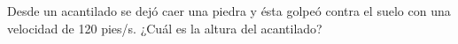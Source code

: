 \item Desde un acantilado se dejó caer una piedra y ésta golpeó contra el suelo con una velocidad de 120 pies/s. ¿Cuál es la altura del acantilado?
